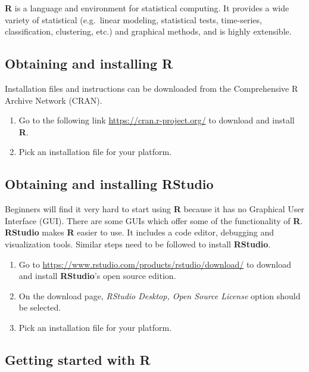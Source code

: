 \documentclass[
  10pt,
  b5paper,
  oneside]{book}
\providecommand{\tightlist}{%
  \setlength{\itemsep}{0pt}\setlength{\parskip}{0pt}}
\begin{document}
\textbf{R} is a language and environment for statistical computing. It provides a wide variety of statistical (e.g.~linear modeling, statistical tests, time-series, classification, clustering, etc.) and graphical methods, and is highly extensible.

\hypertarget{obtaining-and-installing-r}{%
\subsection{Obtaining and installing R}\label{obtaining-and-installing-r}}

Installation files and instructions can be downloaded from the Comprehensive R Archive Network (CRAN).

\begin{enumerate}
\def\labelenumi{\arabic{enumi}.}
\tightlist
\item
  Go to the following link \url{https://cran.r-project.org/} to download and install \textbf{R}.
\item
  Pick an installation file for your platform.
\end{enumerate}

\hypertarget{obtaining-and-installing-rstudio}{%
\subsection{Obtaining and installing RStudio}\label{obtaining-and-installing-rstudio}}

Beginners will find it very hard to start using \textbf{R} because it has no Graphical User Interface (GUI). There are some GUIs which offer some of the functionality of \textbf{R}. \textbf{RStudio} makes \textbf{R} easier to use. It includes a code editor, debugging and visualization tools. Similar steps need to be followed to install \textbf{RStudio}.

\begin{enumerate}
\def\labelenumi{\arabic{enumi}.}
\tightlist
\item
  Go to \url{https://www.rstudio.com/products/rstudio/download/} to download and install \textbf{RStudio}'s open source edition.
\item
  On the download page, \emph{RStudio Desktop, Open Source License} option should be selected.
\item
  Pick an installation file for your platform.
\end{enumerate}

\hypertarget{getting-started-with-r}{%
\subsection{Getting started with R}\label{getting-started-with-r}}
\end{document}
